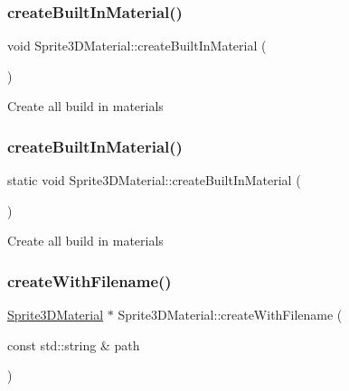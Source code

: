 \subsubsection{\texorpdfstring{create\+Built\+In\+Material()}{createBuiltInMaterial()}\hspace{0.1cm}{\footnotesize\ttfamily [3/4]}}
{\footnotesize\ttfamily void Sprite3\+D\+Material\+::create\+Built\+In\+Material (\begin{DoxyParamCaption}{ }\end{DoxyParamCaption})\hspace{0.3cm}{\ttfamily [static]}}

Create all build in materials \mbox{\label{classSprite3DMaterial_a05618c25f5d1244f8d6d2b09a3783e9d}} 
\subsubsection{\texorpdfstring{create\+Built\+In\+Material()}{createBuiltInMaterial()}\hspace{0.1cm}{\footnotesize\ttfamily [4/4]}}
{\footnotesize\ttfamily static void Sprite3\+D\+Material\+::create\+Built\+In\+Material (\begin{DoxyParamCaption}{ }\end{DoxyParamCaption})\hspace{0.3cm}{\ttfamily [static]}}

Create all build in materials \mbox{\label{classSprite3DMaterial_a127e29f086848a762afca729d513efbf}} 
\subsubsection{\texorpdfstring{create\+With\+Filename()}{createWithFilename()}\hspace{0.1cm}{\footnotesize\ttfamily [1/2]}}
{\footnotesize\ttfamily \hyperlink{classSprite3DMaterial}{Sprite3\+D\+Material} $\ast$ Sprite3\+D\+Material\+::create\+With\+Filename (\begin{DoxyParamCaption}\item[{const std\+::string \&}]{path }\end{DoxyParamCaption})\hspace{0.3cm}{\ttfamily [static]}}

